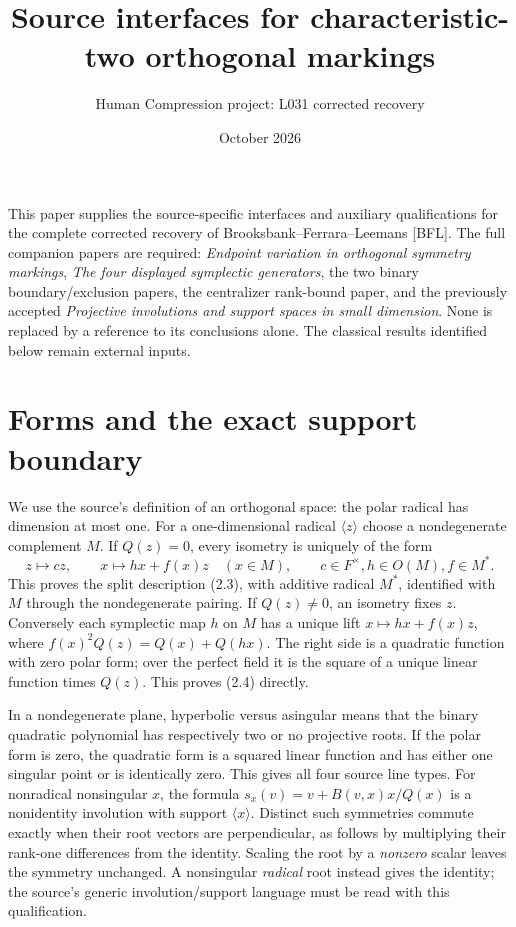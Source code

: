 \documentclass[11pt,a4paper]{article}
\title{Source interfaces for characteristic-two orthogonal markings}
\author{Human Compression project: L031 corrected recovery}
\date{October 2026}
\newcommand{\gen}[1]{\langle#1\rangle}
\begin{document}
\maketitle
This paper supplies the source-specific interfaces and auxiliary
qualifications for the complete corrected recovery of
Brooksbank--Ferrara--Leemans [BFL]. The full companion papers are
required: \emph{Endpoint variation in orthogonal symmetry markings},
\emph{The four displayed symplectic generators}, the two binary
boundary/exclusion papers, the centralizer rank-bound paper, and the
previously accepted \emph{Projective involutions and support spaces
in small dimension}. None is replaced by a reference to its conclusions
alone. The classical results identified below remain external inputs.

\section{Forms and the exact support boundary}
We use the source's definition of an orthogonal space: the polar
radical has dimension at most one. For a one-dimensional radical
$\gen z$ choose a nondegenerate complement $M$. If $Q(z)=0$, every
isometry is uniquely of the form
\[
 z\longmapsto cz,\qquad x\longmapsto hx+f(x)z\quad(x\in M),
 \qquad c\in F^\times, h\in O(M), f\in M^*.
\]
This proves the split description (2.3), with additive radical
$M^*$, identified with $M$ through the nondegenerate pairing.
If $Q(z)\ne0$, an isometry fixes $z$. Conversely each symplectic
map $h$ on $M$ has a unique lift
$x\mapsto hx+f(x)z$, where
$f(x)^2Q(z)=Q(x)+Q(hx)$. The right side is a quadratic function
with zero polar form; over the perfect field it is the square of a
unique linear function times $Q(z)$. This proves (2.4) directly.

In a nondegenerate plane, hyperbolic versus asingular means that
the binary quadratic polynomial has respectively two or no
projective roots. If the polar form is zero, the quadratic form
is a squared linear function and has either one singular point
or is identically zero. This gives all four source line types.
For nonradical nonsingular $x$, the formula
$s_x(v)=v+B(v,x)x/Q(x)$ is a nonidentity involution with support
$\gen x$. Distinct such symmetries commute exactly when their
root vectors are perpendicular, as follows by multiplying their
rank-one differences from the identity. Scaling the root by a
\emph{nonzero} scalar leaves the symmetry unchanged. A nonsingular
\emph{radical} root instead gives the identity; the source's generic
involution/support language must be read with this qualification.
\end{document}
